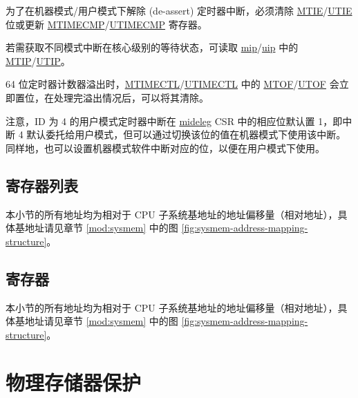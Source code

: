 \documentclass[main\_\_CN.tex]{subfiles}
\begin{document}
为了在机器模式/用户模式下解除 (de-assert) 定时器中断，必须清除 \hyperref[fielddesc:CLINTMTIMECTLMTIE]{MTIE}/\hyperref[fielddesc:CLINTUTIMECTLUTIE]{UTIE} 位或更新 \hyperref[regdesc:CLINTMTIMECMPREG]{MTIMECMP}/\hyperref[regdesc:CLINTUTIMECMPREG]{UTIMECMP} 寄存器。

若需获取不同模式中断在核心级别的等待状态，可读取 \hyperref[regdesc:MIP]{mip}/\hyperref[regdesc:UIP]{uip} 中的 \hyperref[fielddesc:MIPMTIP]{MTIP}/\hyperref[fielddesc:UIPUTIP]{UTIP}。

64 位定时器计数器溢出时，\hyperref[regdesc:CLINTMTIMECTLREG]{MTIMECTL}/\hyperref[regdesc:CLINTUTIMECTLREG]{UTIMECTL} 中的 \hyperref[fielddesc:CLINTMTIMECTLMTOF]{MTOF}/\hyperref[fielddesc:CLINTUTIMECTLUTOF]{UTOF} 会立即置位，在处理完溢出情况后，可以将其清除。

注意，ID 为 4 的用户模式定时器中断在 \hyperref[regdesc:MIDELEG]{mideleg} CSR 中的相应位默认置 1，即中断 4 默认委托给用户模式，但可以通过切换该位的值在机器模式下使用该中断。同样地，也可以设置机器模式软件中断对应的位，以便在用户模式下使用。


\hypertarget{riscvcpu-clint-reg-summ}{}
\subsection{寄存器列表}
\label{sec:riscvcpu-clint-reg-summ}

本小节的所有地址均为相对于 CPU 子系统基地址的地址偏移量（相对地址），具体基地址请见章节 \ref{mod:sysmem} \textit{} 中的图 \ref{fig:sysmem-address-mapping-structure}。




\subsection{寄存器}

本小节的所有地址均为相对于 CPU 子系统基地址的地址偏移量（相对地址），具体基地址请见章节 \ref{mod:sysmem} \textit{} 中的图 \ref{fig:sysmem-address-mapping-structure}。



\clearpage
\section{物理存储器保护}
\label{sec:riscvcpu-pmp}
\end{document}
